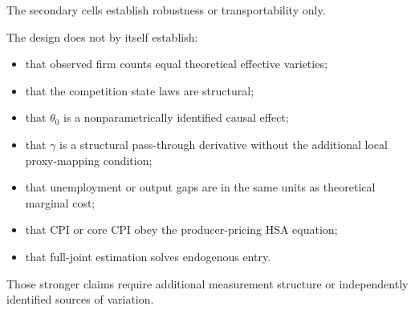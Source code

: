 \documentclass[11pt]{article}
\begin{document}
The secondary cells establish robustness or transportability only.

The design does not by itself establish:
\begin{itemize}
\item that observed firm counts equal theoretical effective varieties;
\item that the competition state laws are structural;
\item that \(\theta_0\) is a nonparametrically identified causal effect;
\item that \(\gamma\) is a structural pass-through derivative without the additional local proxy-mapping condition;
\item that unemployment or output gaps are in the same units as theoretical marginal cost;
\item that CPI or core CPI obey the producer-pricing HSA equation;
\item that full-joint estimation solves endogenous entry.
\end{itemize}

Those stronger claims require additional measurement structure or independently identified sources of variation.
\end{document}
